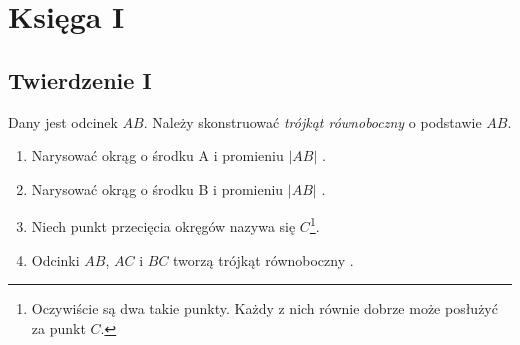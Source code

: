 \documentclass[12pt, a4paper]{scrartcl}
\begin{document}
\pagebreak

\section*{Księga I}
\subsection*{Twierdzenie I}

Dany jest odcinek $AB$. Należy skonstruować \emph{trójkąt równoboczny} o
podstawie $AB$.

\begin{figure}[h!]
    \begin{center}
    \end{center}
\end{figure}

\begin{enumerate}
    \item Narysować okrąg o środku A i promieniu $|AB|$ .
    \item Narysować okrąg o środku B i promieniu $|AB|$ .
    \item Niech punkt przecięcia okręgów nazywa się $C$\footnote{
        Oczywiście są dwa takie punkty. Każdy z nich równie dobrze może posłużyć
        za punkt $C$.
    }.
    \item Odcinki $AB$, $AC$ i $BC$ tworzą trójkąt równoboczny .
\end{enumerate}

\end{document}

